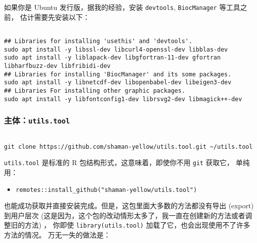 \documentclass[
]{article}
\providecommand{\tightlist}{%
  \setlength{\itemsep}{0pt}\setlength{\parskip}{0pt}}
\begin{document}
如果你是 Ubuntu 发行版，据我的经验，安装 \texttt{devtools}, \texttt{BiocManager} 等工具之前，
估计需要先安装以下：

\begin{tcolorbox}[colback = gray!10, colframe = red!50, width = 16cm, arc = 1mm, auto outer arc, title = {Bash input}]
\begin{verbatim}

## Libraries for installing 'usethis' and 'devtools'.
sudo apt install -y libssl-dev libcurl4-openssl-dev libblas-dev
sudo apt install -y liblapack-dev libgfortran-11-dev gfortran libharfbuzz-dev libfribidi-dev
## Libraries for installing 'BiocManager' and its some packages.
sudo apt install -y libnetcdf-dev libopenbabel-dev libeigen3-dev
## Libraries For installing other graphic packages.
sudo apt install -y libfontconfig1-dev librsvg2-dev libmagick++-dev

\end{verbatim}
\end{tcolorbox}

\hypertarget{ux4e3bux4f53utils.tool}{%
\subsubsection{\texorpdfstring{主体：\texttt{utils.tool}}{主体：utils.tool}}\label{ux4e3bux4f53utils.tool}}

\begin{tcolorbox}[colback = gray!10, colframe = red!50, width = 16cm, arc = 1mm, auto outer arc, title = {Bash input}]
\begin{verbatim}

git clone https://github.com/shaman-yellow/utils.tool.git ~/utils.tool

\end{verbatim}
\end{tcolorbox}

\texttt{utils.tool} 是标准的 R 包结构形式，这意味着，即使你不用 \texttt{git} 获取它，
单纯用：

\begin{itemize}
\tightlist
\item
  \texttt{remotes::install\_github("shaman-yellow/utils.tool")}
\end{itemize}

也能成功获取并直接安装完成。但是，这包里面大多数的方法都没有导出 (export) 到用户层次
(这是因为，这个包的改动情形太多了，我一直在创建新的方法或者调整旧的方法) ，
你即使 \texttt{library(utils.tool)} 加载了它，也会出现使用不了许多方法的情况。
万无一失的做法是：
\end{document}
